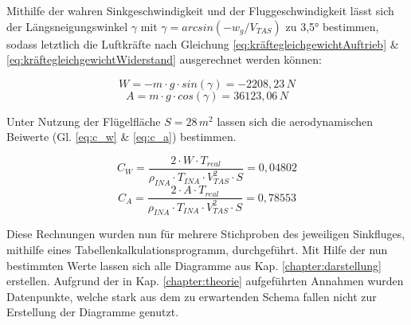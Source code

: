 \noindent Mithilfe der wahren Sinkgeschwindigkeit und der Fluggeschwindigkeit lässt sich der Längsneigungswinkel $\gamma$ mit $\gamma = arcsin(-w_g/V_{TAS})$ zu 3,5° bestimmen, sodass letztlich die Luftkräfte nach Gleichung \ref{eq:kräftegleichgewichtAuftrieb} \& \ref{eq:kräftegleichgewichtWiderstand} ausgerechnet werden können:

\begin{equation*}
W = - m\cdot g \cdot sin(\gamma) = -2208,23\,N
\end{equation*}
\begin{equation*}
A = m\cdot g \cdot cos(\gamma) = 36123,06\,N
\end{equation*}

\vspace{5mm} \noindent
Unter Nutzung der Flügelfläche $S = 28\,m^2$  lassen sich die aerodynamischen Beiwerte (Gl. \ref{eq:c_w} \& \ref{eq:c_a}) bestimmen.

\begin{equation*}
C_W = \frac{2 \cdot W \cdot T_{real}}{\rho_{INA} \cdot T_{INA} \cdot V_{TAS}^2 \cdot S} = 0,04802
\end{equation*}
\begin{equation*}
C_A = \frac{2 \cdot A \cdot T_{real}}{\rho_{INA} \cdot T_{INA} \cdot V_{TAS}^2 \cdot S} = 0,78553
\end{equation*}

\vspace{5mm} 

\noindent 
Diese Rechnungen wurden nun für mehrere Stichproben des jeweiligen Sinkfluges, mithilfe eines Tabellenkalkulationsprogramm, durchgeführt. Mit Hilfe der nun bestimmten Werte lassen sich alle Diagramme aus Kap. \ref{chapter:darstellung} erstellen. Aufgrund der in Kap. \ref{chapter:theorie} aufgeführten Annahmen wurden Datenpunkte, welche stark aus dem zu erwartenden Schema fallen nicht zur Erstellung der Diagramme genutzt. 

\newpage